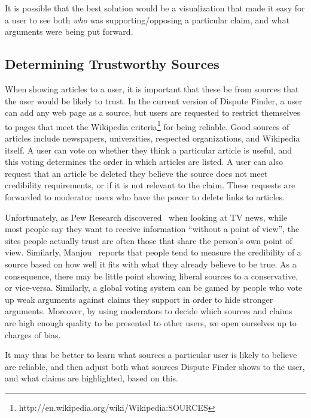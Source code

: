 \documentclass{www2010-accepted}
\begin{document}
It is possible that the best solution would be a visualization that made it easy for a user to see both {\it who} was supporting/opposing a particular claim, and what arguments were being put forward.


\subsection{Determining Trustworthy Sources}

When showing articles to a user, it is important that these be from sources that the user would be likely to trust. In the current version of Dispute Finder, a user can add any web page as a source, but users are requested to restrict themselves to pages that meet the Wikipedia criteria\footnote{http://en.wikipedia.org/wiki/Wikipedia:SOURCES} for being reliable. Good sources of articles include newspapers, universities, respected organizations, and Wikipedia itself. A user can vote on whether they think a particular article is useful, and this voting determines the order in which articles are listed. A user can also request that an article be deleted they believe the source does not meet credibility requirements, or if it is not relevant to the claim. These requests are forwarded to moderator users who have the power to delete links to articles.

Unfortunately, as Pew Research discovered~\cite{PewResearch2008} when looking at TV news, while most people say they want to receive information ``without a point of view'', the sites people actually trust are often those that share the person's own point of view. Similarly, Manjou~\cite{Manjou2008} reports that people tend to measure the credibility of a source based on how well it fits with what they already believe to be true.  As a consequence, there may be little point showing liberal sources to a conservative, or vice-versa. Similarly, a global voting system can be gamed by people who vote up weak arguments against claims they support in order to hide stronger arguments. Moreover, by using moderators to decide which sources and claims are high enough quality to be presented to other users, we open ourselves up to charges of bias.

It may thus be better to learn what sources a particular user is likely to believe are reliable, and then adjust both what sources Dispute Finder shows to the user, and what claims are highlighted, based on this.
\end{document}
